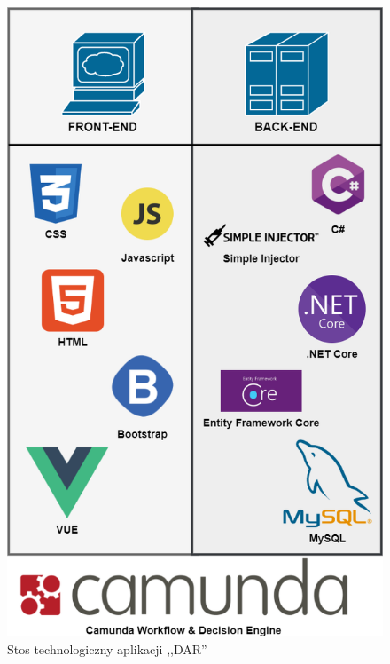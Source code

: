 \begin{figure}
    \centering
    \includegraphics[width=\textwidth, height=0.4\textheight,keepaspectratio]{./assets/technologyStack.png}
    \caption{Stos technologiczny aplikacji ,,DAR''}
    \label{fig:technologyStack}
\end{figure} 

